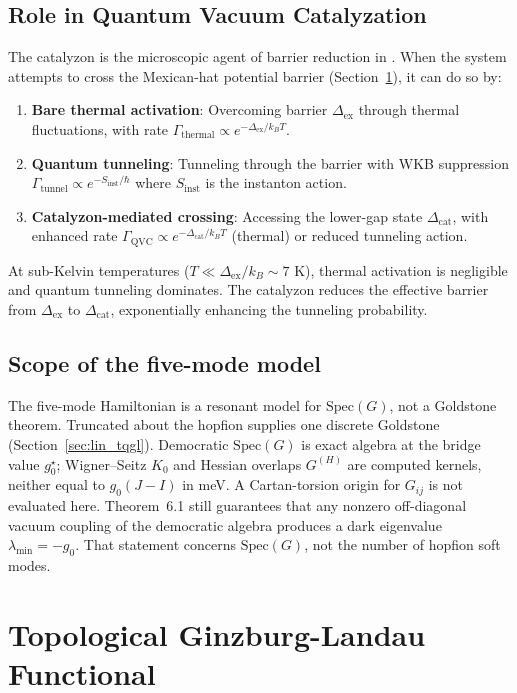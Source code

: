 \documentclass[11pt,letterpaper]{article}
\begin{document}
\subsection{Role in Quantum Vacuum Catalyzation}

The catalyzon is the microscopic agent of barrier reduction in \QVC{}. When the system attempts to cross the Mexican-hat potential barrier (Section~\ref{sec:tqgl}), it can do so by:
\begin{enumerate}
    \item \textbf{Bare thermal activation}: Overcoming barrier $\Delta_{\text{ex}}$ through thermal fluctuations, with rate $\Gamma_{\text{thermal}} \propto e^{-\Delta_{\text{ex}}/k_B T}$.
    \item \textbf{Quantum tunneling}: Tunneling through the barrier with WKB suppression $\Gamma_{\text{tunnel}} \propto e^{-S_{\text{inst}}/\hbar}$ where $S_{\text{inst}}$ is the instanton action.
    \item \textbf{Catalyzon-mediated crossing}: Accessing the lower-gap state $\Delta_{\text{cat}}$, with enhanced rate $\Gamma_{\text{QVC}} \propto e^{-\Delta_{\text{cat}}/k_B T}$ (thermal) or reduced tunneling action.
\end{enumerate}

At sub-Kelvin temperatures ($T \ll \Delta_{\text{ex}}/k_B \sim 7$ K), thermal activation is negligible and quantum tunneling dominates. The catalyzon reduces the effective barrier from $\Delta_{\text{ex}}$ to $\Delta_{\text{cat}}$, exponentially enhancing the tunneling probability.

\subsection{Scope of the five-mode model}

The five-mode Hamiltonian is a resonant model for $\mathrm{Spec}(G)$, not a Goldstone theorem. Truncated \TQGL{} about the hopfion supplies one discrete Goldstone (Section~\ref{sec:lin_tqgl}). Democratic $\mathrm{Spec}(G)$ is exact algebra at the bridge value $g_0^\star$; Wigner--Seitz $K_0$ and Hessian overlaps $G^{(H)}$ are computed kernels, neither equal to $g_0(J-I)$ in meV. A Cartan-torsion origin for $G_{ij}$ is not evaluated here. Theorem~6.1 still guarantees that any nonzero off-diagonal vacuum coupling of the democratic algebra produces a dark eigenvalue $\lambda_{\min}=-g_0$. That statement concerns $\mathrm{Spec}(G)$, not the number of hopfion soft modes.

\section{Topological Ginzburg-Landau Functional}
\label{sec:tqgl}
\end{document}
